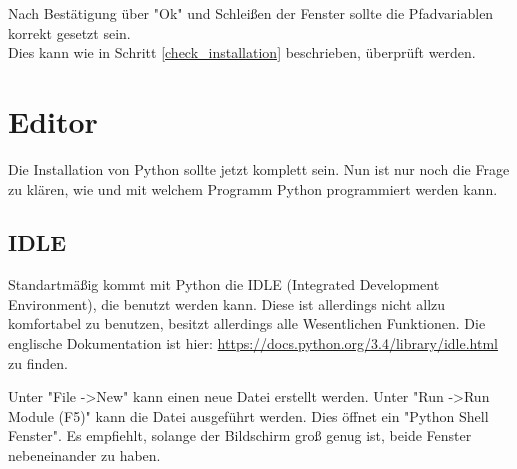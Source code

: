 \documentclass[ngerman,oneside, a4letter]{article}
\begin{document}
\noindent Nach Bestätigung über "Ok" und Schleißen der Fenster sollte die Pfadvariablen korrekt gesetzt sein.
\\
Dies kann wie in Schritt \ref{check_installation} beschrieben, überprüft werden.

\clearpage

\section{Editor}
Die Installation von Python sollte jetzt komplett sein. Nun ist nur noch die Frage zu klären, wie und mit welchem Programm Python programmiert werden kann.
\\
\subsection{IDLE}
Standartmäßig kommt mit Python die IDLE (Integrated Development Environment), die benutzt werden kann. Diese ist allerdings nicht allzu komfortabel zu benutzen, besitzt allerdings alle Wesentlichen Funktionen. Die englische Dokumentation ist hier: \url{https://docs.python.org/3.4/library/idle.html} zu finden.
\begin{center}
\end{center}
Unter "File -\textgreater New" kann einen neue Datei erstellt werden. Unter "Run -\textgreater Run Module (F5)" kann die Datei ausgeführt werden. Dies öffnet ein "Python Shell Fenster". Es empfiehlt, solange der Bildschirm groß genug ist, beide Fenster nebeneinander zu haben.
\end{document}
